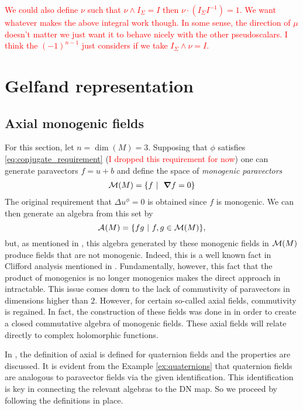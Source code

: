 \documentclass[12pt]{article}
\begin{document}

\textcolor{red}{We could also define $\nu$ such that $\nu \wedge I_\Sigma = I$ then $\nu\cdot(I_\Sigma I^{-1})=1$. We want whatever makes the above integral work though. In some sense, the direction of $\mu$ doesn't matter we just want it to behave nicely with the other pseudoscalars. I think the $(-1)^{n-1}$ just considers if we take $I_\Sigma \wedge \nu = I$. }

\section{Gelfand representation}

\subsection{Axial monogenic fields}

For this section, let $n=\dim(M)=3$. Supposing that $\phi$ satisfies \ref{eq:conjugate_requirement} (\textcolor{red}{I dropped this requirement for now}) one can generate paravectors $f=u+b$ and define the space of \emph{monogenic paravectors}
\begin{align*}
\mathcal{M}(M) &= \{ f ~ \vert ~ ~\boldsymbol{\nabla} f=0\}\\
\end{align*}
The original requirement that $\Delta u^\phi =0$ is obtained since $f$ is monogenic. We can then generate an algebra from this set by
\[
\mathcal{A}_{}(M) = \{ fg ~\vert~ f,g \in \mathcal{M}(M)\},
\]
but, as mentioned in \cite{belishev_algebras_2019}, this algebra generated by these monogenic fields in $\mathcal{M}(M)$ produce fields that are not monogenic.  Indeed, this is a well known fact in Clifford analysis mentioned in \cite{schepper_introductory_nodate}.  Fundamentally, however, this fact that the product of monogenics is no longer monogenics makes the direct approach in \cite{belishev_calderon_2003} intractable. This issue comes down to the lack of commutivity of paravectors in dimensions higher than $2$.  However, for certain so-called axial fields, commutivity is regained. In fact, the construction of these fields was done in \cite{belishev_algebras_2017} in order to create a closed commutative algebra of monogenic fields. These axial fields will relate directly to complex holomorphic functions.

In \cite{belishev_algebras_2017, belishev_algebras_2019}, the definition of axial is defined for quaternion fields and the properties are discussed.  It is evident from the Example \ref{ex:quaternions} that quaternion fields are analogous to paravector fields via the given identification.  This identification is key in connecting the relevant algebras to the DN map. So we proceed by following the definitions in place.  
\end{document}
